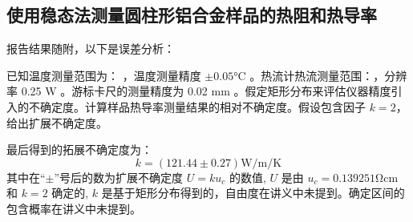 \documentclass[a4paper,utf8]{article}
\newcommand{\TTR}[0]{\watt\per\m\per\K}
\begin{document}
    \subsection{使用稳态法测量圆柱形铝合金样品的热阻和热导率}
        报告结果随附，以下是误差分析：\par
        已知温度测量范围为： ，温度测量精度 $\pm 0.05 \unit{\degreeCelsius}$ 。热流计热流测量范围：\linebreak {}，分辨率 0.25 \unit{\watt} 。游标卡尺的测量精度为 0.02 \unit{\mm} 。假定矩形分布来评估仪器精度引入的不确定度。计算样品热导率测量结果的相对不确定度。假设包含因子 $k=2$，给出扩展不确定度。
        \begin{figure}[!ht]
        \end{figure}\par
        最后得到的拓展不确定度为：
        \begin{equation*}
            k = ( 121.44 \pm 0.27 ) \unit{\TTR}
        \end{equation*}
        其中在“$\pm$”号后的数为扩展不确定度 $U=ku_c$ 的数值, $ U $ 是由 $ u_c= 0.139251 \unit{\ohm\cm}$ 和 $ k = 2 $ 确定的, $k$ 是基于矩形分布得到的，自由度在讲义中未提到。确定区间的包含概率在讲义中未提到。\par
\end{document}
